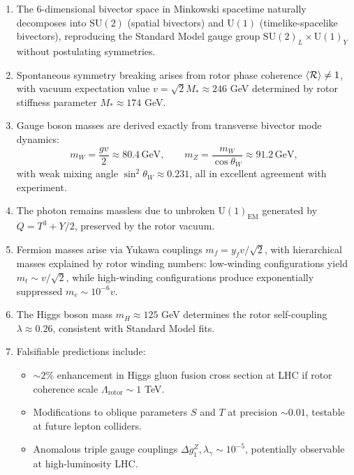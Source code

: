 \documentclass[11pt,a4paper]{article}
\newcommand{\Rotor}{\mathcal{R}}
\newcommand{\SU}{\mathrm{SU}}
\newcommand{\U}{\mathrm{U}}
\theoremstyle{definition}
\theoremstyle{plain}
\theoremstyle{remark}
\begin{document}
\begin{enumerate}[leftmargin=*,itemsep=3pt]
  \item The 6-dimensional bivector space in Minkowski spacetime naturally decomposes into $\SU(2)$ (spatial bivectors) and $\U(1)$ (timelike-spacelike bivectors), reproducing the Standard Model gauge group $\SU(2)_L \times \U(1)_Y$ without postulating symmetries.

  \item Spontaneous symmetry breaking arises from rotor phase coherence $\ev{\Rotor} \neq 1$, with vacuum expectation value $v = \sqrt{2}M_\ast \approx 246$ GeV determined by rotor stiffness parameter $M_\ast \approx 174$ GeV.

  \item Gauge boson masses are derived exactly from transverse bivector mode dynamics:
  \begin{equation*}
  m_W = \frac{gv}{2} \approx 80.4\,\text{GeV}, \qquad
  m_Z = \frac{m_W}{\cos\theta_W} \approx 91.2\,\text{GeV},
  \end{equation*}
  with weak mixing angle $\sin^2\theta_W \approx 0.231$, all in excellent agreement with experiment.

  \item The photon remains massless due to unbroken $\U(1)_{\text{EM}}$ generated by $Q = T^3 + Y/2$, preserved by the rotor vacuum.

  \item Fermion masses arise via Yukawa couplings $m_f = y_f v/\sqrt{2}$, with hierarchical masses explained by rotor winding numbers: low-winding configurations yield $m_t \sim v/\sqrt{2}$, while high-winding configurations produce exponentially suppressed $m_e \sim 10^{-6}v$.

  \item The Higgs boson mass $m_H \approx 125$ GeV determines the rotor self-coupling $\lambda \approx 0.26$, consistent with Standard Model fits.

  \item Falsifiable predictions include:
  \begin{itemize}
    \item $\sim 2\%$ enhancement in Higgs gluon fusion cross section at LHC if rotor coherence scale $\Lambda_{\text{rotor}} \sim 1$ TeV.
    \item Modifications to oblique parameters $S$ and $T$ at precision $\sim 0.01$, testable at future lepton colliders.
    \item Anomalous triple gauge couplings $\Delta g_1^Z, \lambda_\gamma \sim 10^{-5}$, potentially observable at high-luminosity LHC.
  \end{itemize}
\end{enumerate}
\end{document}
